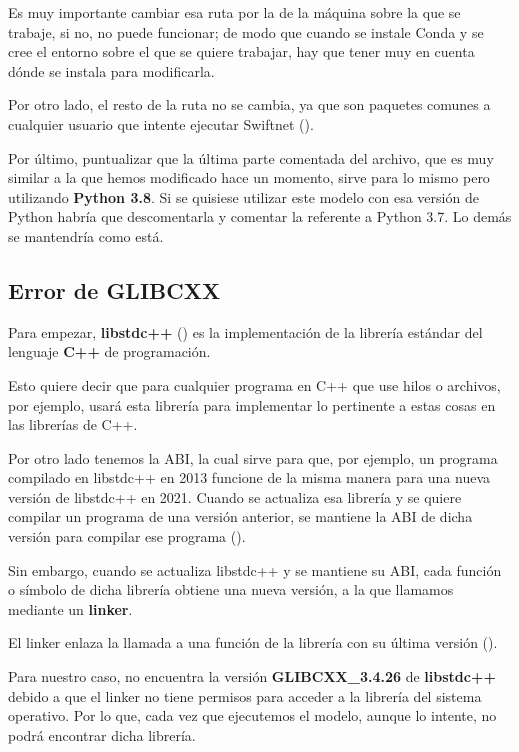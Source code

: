 Es muy importante cambiar esa ruta por la de la máquina sobre la que se trabaje, si no, no puede funcionar; de modo que cuando se instale Conda y se cree el entorno sobre el que se quiere trabajar, hay que tener muy en cuenta dónde se instala para modificarla.

Por otro lado, el resto de la ruta no se cambia, ya que son paquetes comunes a cualquier usuario que intente ejecutar Swiftnet (\cite{swiftnet}).

Por último, puntualizar que la última parte comentada del archivo, que es muy similar a la que hemos modificado hace un momento, sirve para lo mismo pero utilizando \textbf{Python 3.8}. Si se quisiese utilizar este modelo con esa versión de Python habría que descomentarla y comentar la referente a Python 3.7. Lo demás se mantendría como está.

\subsection{Error de GLIBCXX}

Para empezar, \textbf{libstdc++} (\cite{glibcxx}) es la implementación de la librería estándar del lenguaje \textbf{C++} de programación.

Esto quiere decir que para cualquier programa en C++ que use hilos o archivos, por ejemplo, usará esta librería para implementar lo pertinente a estas cosas en las librerías de C++.

Por otro lado tenemos la \ac{ABI}, la cual sirve para que, por ejemplo, un programa compilado en libstdc++ en 2013 funcione de la misma manera para una nueva versión de libstdc++ en 2021. Cuando se actualiza esa librería y se quiere compilar un programa de una versión anterior, se mantiene la \ac{ABI} de dicha versión para compilar ese programa (\cite{glibcxx}).

Sin embargo, cuando se actualiza libstdc++ y se mantiene su \ac{ABI}, cada función o símbolo de dicha librería obtiene una nueva versión, a la que llamamos mediante un \textbf{linker}.

El linker enlaza la llamada a una función de la librería con su última versión (\cite{glibcxx}).

Para nuestro caso, no encuentra la versión \textbf{GLIBCXX\_3.4.26} de \textbf{libstdc++} debido a que el linker no tiene permisos para acceder a la librería del sistema operativo. Por lo que, cada vez que ejecutemos el modelo, aunque lo intente, no podrá encontrar dicha librería.


